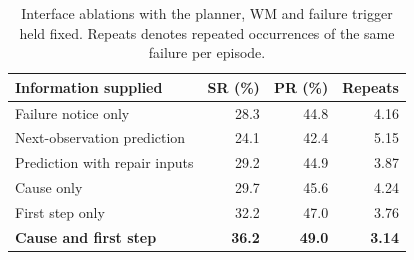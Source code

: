 \begin{table}[tbp]
\caption{Interface ablations with the planner, WM and failure trigger held fixed. Repeats denotes repeated occurrences of the same failure per episode.}
\label{tab:ablation}\centering
\begin{tabular}{lrrr}\toprule
Information supplied & SR (\%) & PR (\%) & Repeats\\\midrule
Failure notice only & 28.3 & 44.8 & 4.16\\
Next-observation prediction & 24.1 & 42.4 & 5.15\\
Prediction with repair inputs & 29.2 & 44.9 & 3.87\\
Cause only & 29.7 & 45.6 & 4.24\\
First step only & 32.2 & 47.0 & 3.76\\
\textbf{Cause and first step} & \textbf{36.2} & \textbf{49.0} & \textbf{3.14}\\\bottomrule
\end{tabular}
\end{table}
